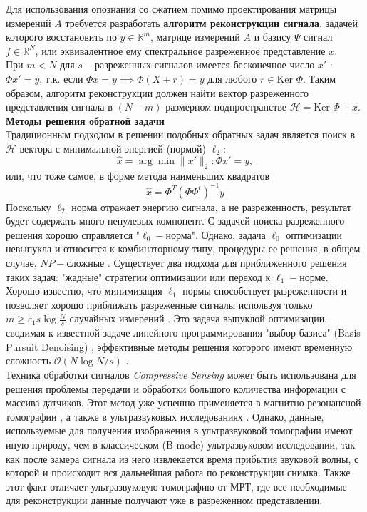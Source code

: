 \documentclass[14pt]{matmex-diploma}
\begin{document}
Для использования опознания со сжатием помимо проектирования матрицы измерений $A$ требуется разработать \textbf{алгоритм реконструкции сигнала}, задачей которого восстановить по $y \in \mathbb{R}^m$, матрице измерений $A$ и базису $\Psi$ сигнал $f \in \mathbb{R}^N$, или эквивалентное ему спектральное разреженное представление $x$.\\
При $m < N$ для $s-$разреженных сигналов имеется бесконечное число $x'$ : $\Phi x' = y$, т.к. если $\Phi x = y \implies \Phi(X+r) = y$ для любого $r \in \text{Ker }\Phi$. Таким образом, алгоритм реконструкции должен найти вектор разреженного представления сигнала в $(N - m)$-размерном подпространстве $\mathcal{H}=\text{Ker }\Phi + x$.\\
\textbf{Методы решения обратной задачи}\\
Традиционным подходом в решении подобных обратных задач является поиск в $\mathcal{H}$ вектора с минимальной энергией (нормой)  $\ell_2$: $$ \hat{x} = \arg\!\min{\| x'\|_2} : \Phi x' = y,$$ или, что тоже самое, в форме метода наименьших квадратов 
$$\hat{x} = \Phi^T (\Phi\Phi^t)^{-1}y$$
Поскольку $\ell_2$ норма  отражает энергию сигнала, а не разреженность, результат будет содержать много ненулевых компонент. С задачей поиска разреженного решения хорошо справляется "$\ell_0-$норма". Однако, задача $\ell_0$ оптимизации невыпукла и относится к комбинаторному типу, процедуры ее решения, в общем случае, $NP-$сложные \cite{natarajan1995sparse}. Существует два подхода для приближенного решения таких задач: "жадные" стратегии оптимизации\cite{mallat1993matching} или переход к $\ell_1-$норме. Хорошо известно, что минимизация $\ell_1$ нормы способствует разреженности \cite{donoho2006most} и позволяет хорошо приближать разреженные сигналы используя только $m \geq c_1 s \log{\frac{N}{s}}$ случайных измерений \cite{donoho2006compressed}\cite{candes2006robust}. Это задача выпуклой оптимизации, сводимая к известной задаче линейного программирования "выбор базиса" (Basis Pursuit Denoising) \cite{chen2001atomic}, эффективные методы решения которого имеют временную сложность $\mathcal{O}(N\log{N/s})$ \cite{berinde2008practical}.\\


Техника обработки сигналов \textit{Compressive Sensing} может быть использована для решения проблемы передачи и обработки большого количества информации с массива датчиков. Этот метод уже успешно применяется в магнитно-резонансной томографии \cite{lustig2008compressed}\cite{lustig2007sparse}, а также в ультразвуковых исследованиях \cite{quinsac2010compressed}. Однако, данные, используемые для получения изображения в ультразвуковой томографии имеют иную природу, чем в классическом (B-mode) ультразвуковом исследовании, так как после замера сигнала из него извлекается время прибытия звуковой волны, с которой и происходит вся дальнейшая работа по реконструкции снимка. Также этот факт отличает ультразвуковую томографию от МРТ, где все необходимые для реконструкции данные получают уже в разреженном представлении.
\end{document}
